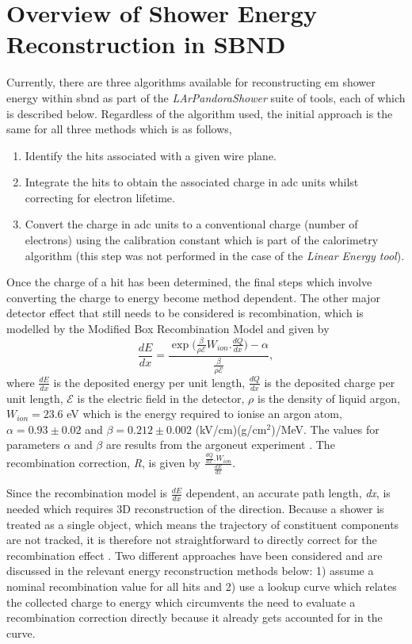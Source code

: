 \section{Overview of Shower Energy Reconstruction in SBND}\label{subchap:shower reco overview}

Currently, there are three algorithms available for reconstructing \gls{em} shower energy within \gls{sbnd} as part of the \textit{LArPandoraShower} suite of tools, each of which is described below. Regardless of the algorithm used, the initial approach is the same for all three methods which is as follows,
\begin{enumerate}
    \item Identify the hits associated with a given wire plane.
    \item Integrate the hits to obtain the associated charge in \gls{adc} units whilst correcting for electron lifetime. 
    \item Convert the charge in \gls{adc} units to a conventional charge (number of electrons) using the calibration constant which is part of the calorimetry algorithm (this step was not performed in the case of the \textit{Linear Energy tool}). 
\end{enumerate}

Once the charge of a hit has been determined, the final steps which involve converting the charge to energy become method dependent. The other major detector effect that still needs to be considered is recombination, which is modelled by the Modified Box Recombination Model and given by  
\begin{equation}\label{eqn:ModBox}
    \frac{dE}{dx} = \frac{\exp{(\frac{\beta}{\rho \mathcal{E}} W_{ion}.\frac{dQ}{dx}}) - \alpha}{\frac{\beta}{\rho \mathcal{E}}},
\end{equation}
where $\frac{dE}{dx}$ is the deposited energy per unit length, $\frac{dQ}{dx}$ is the deposited charge per unit length,  $\mathcal{E}$ is the electric field in the detector, $\rho$ is the density of liquid argon, $W_{ion} = 23.6$ eV which is the energy required to ionise an argon atom, $\alpha = 0.93 \pm 0.02$ and $\beta = 0.212 \pm 0.002$ (kV/cm)(g/cm$^2$)/MeV. The values for parameters $\alpha$ and $\beta$ are results from the \Gls{argoneut} experiment \cite{ArgoNeuT_recombination_paper}. The recombination correction, \textit{R}, is given by $\frac{\frac{dQ}{dx}.W_{ion}}{\frac{dE}{dx}}$.


Since the recombination model is $\frac{dE}{dx}$ dependent, an accurate path length, \textit{dx}, is needed which requires 3D reconstruction of the direction. Because a shower is treated as a single object, which means the trajectory of constituent components are not tracked, it is therefore not straightforward to directly correct for the recombination effect \cite{MicroBooNE_photon_Ereco_paper}. Two different approaches have been considered and are discussed in the relevant energy reconstruction methods below: 1) assume a nominal recombination value for all hits and 2) use a lookup curve which relates the collected charge to energy which circumvents the need to evaluate a recombination correction directly because it already gets accounted for in the curve.

